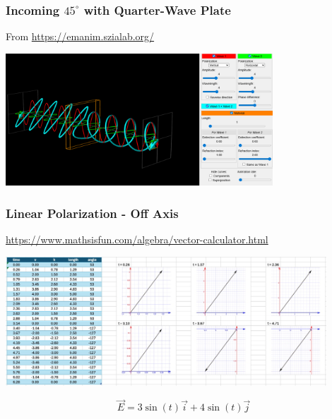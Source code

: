 \documentclass{beamer}
\begin{document}
\begin{frame}\frametitle{Incoming $45^\circ$ with Quarter-Wave Plate}
From \url{https://emanim.szialab.org/}

\begin{center}
\includegraphics[width=10cm]{fig/waveplate_45_4.png}
\end{center}
\end{frame}

\begin{frame}\frametitle{Linear Polarization - Off Axis}

\url{https://www.mathsisfun.com/algebra/vector-calculator.html}

\begin{center}
\includegraphics[width=12cm]{fig/pol1.jpg}
\end{center}

\begin{equation}
\vec{E} = 3 \sin{(t)} \vec{i} + 4 \sin{(t)} \vec{j}
\end{equation}

\end{frame}
\end{document}
